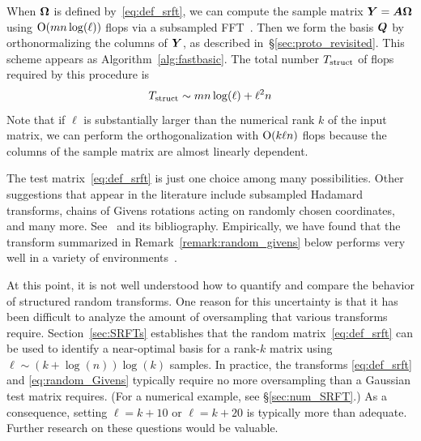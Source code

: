 \documentclass[final]{siamltex}
\newcommand{\pgnotate}[1]{{\color{blue}[#1]}}
\begin{document}
When $\bm{\Omega}$ is defined by~\eqref{eq:def_srft}, we can compute the sample
matrix $\bm{Y} = \bm{A\Omega}$ using $\mathrm{O}(mn\log(\ell))$ flops via a
subsampled FFT~\cite{random2}.
Then we form the basis $\bm{Q}$ by orthonormalizing
the columns of $\bm{Y}$, as described in~\S\ref{sec:proto_revisited}.
This scheme appears as Algorithm~\ref{alg:fastbasic}.
The total number $T_{\rm struct}$ of flops required by this procedure is
\begin{equation}
\label{eq:cost_SRFT}
T_{\rm struct} \sim mn \log(\ell) + \ell^2 n
\end{equation}
%
Note that if $\ell$ is substantially larger than the numerical rank $k$
of the input matrix, we can perform the orthogonalization with $\mathrm{O}( k \ell n)$
flops because the columns of the sample matrix are almost linearly dependent.

The test matrix~\eqref{eq:def_srft} is just one choice among many
possibilities.  Other suggestions that appear in the literature include
subsampled Hadamard transforms, chains of Givens rotations acting on
randomly chosen coordinates, and many more.  See~\cite{liberty_diss}
and its bibliography.  Empirically, we have found that the transform
summarized in Remark~\ref{remark:random_givens} below performs very
well in a variety of environments~\cite{2008_rokhlin_leastsquares}.

At this point, it is not well understood how to quantify and compare
the behavior of structured random transforms.  One reason for this
uncertainty is that it has been difficult to analyze the amount
of oversampling that various transforms require.  Section~\ref{sec:SRFTs}
establishes that the random matrix~\eqref{eq:def_srft} can be used to
identify a near-optimal basis for a rank-$k$ matrix using
$\ell \sim (k + \log(n)) \log(k)$ samples.
%
%
In practice, the transforms \eqref{eq:def_srft} and \eqref{eq:random_Givens}
typically require no more oversampling than a Gaussian test matrix requires.
(For a numerical example, see \S\ref{sec:num_SRFT}.)
As a consequence, setting $\ell = k + 10$ or $\ell = k + 20$ is typically more than
adequate. Further research on these questions would be valuable.
\end{document}
